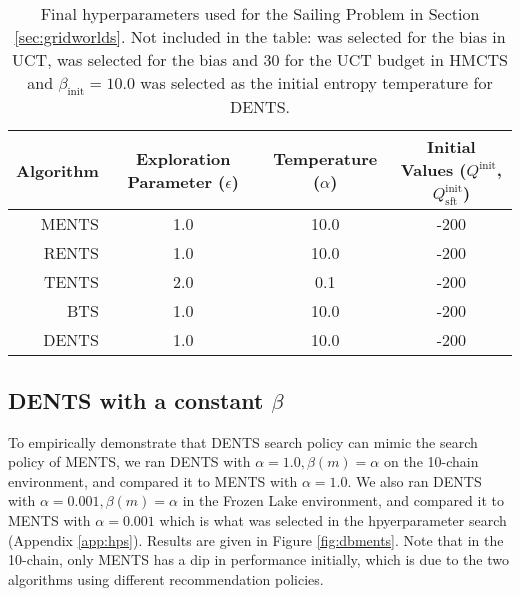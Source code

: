 \documentclass{article}
\theoremstyle{plain}
\begin{document}
\begin{appendices}
        \begin{table}[]
            \centering
            \begin{tabular}{r|ccc} 
                Algorithm   & Exploration Parameter ($\epsilon$)    & Temperature ($\alpha$)    & Initial Values ($Q^{\text{init}}$, $Q^{\text{init}}_{\text{sft}}$)    \\
                \hline
                MENTS       & 1.0                                   & 10.0                      & -200                                                                  \\
                RENTS       & 1.0                                   & 10.0                      & -200                                                                  \\
                TENTS       & 2.0                                   & 0.1                       & -200                                                                  \\
                BTS         & 1.0                                   & 10.0                      & -200                                                                  \\
                DENTS       & 1.0                                   & 10.0                      & -200                                                                  \\
            \end{tabular}
            \caption[Final hyperparameters used for the Sailing Problem in Section \ref{sec:gridworlds}]{Final hyperparameters used for the Sailing Problem in Section \ref{sec:gridworlds}. Not included in the table:  was selected for the bias in UCT,  was selected for the bias and 30 for the UCT budget in HMCTS and $\beta_{\text{init}}=10.0$ was selected as the initial entropy temperature for DENTS. \label{table:hyper_s}}
        \end{table}
        
            
            
            
            
            

	\subsection{DENTS with a constant $\beta$} \label{app:dents_mimic_ments}
		To empirically demonstrate that DENTS search policy can mimic the search policy of MENTS, we ran DENTS with $\alpha=1.0,\beta(m)=\alpha$ on the 10-chain environment, and compared it to MENTS with $\alpha=1.0$. We also ran DENTS with $\alpha=0.001, \beta(m)=\alpha$ in the Frozen Lake environment, and compared it to MENTS with $\alpha=0.001$ which is what was selected in the hpyerparameter search (Appendix \ref{app:hps}). Results are given in Figure \ref{fig:dbments}. Note that in the 10-chain, only MENTS has a dip in performance initially, which is due to the two algorithms using different recommendation policies.
		

\end{appendices}
\end{document}
